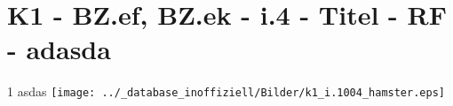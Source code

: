 \section{K1 - BZ.ef, BZ.ek - i.4 - Titel - RF - adasda}

\begin{langesbeispiel}\item[1] %
asdas \texttt{[image: ../\_database\_inoffiziell/Bilder/k1\_i.1004\_hamster.eps]}

\end{langesbeispiel}
